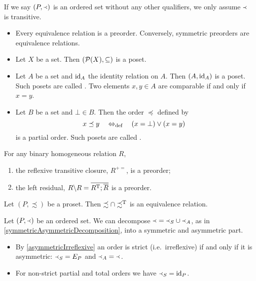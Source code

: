 If we say $\left( P,\Yleft \right)$ is an ordered set without any other qualifiers, we only assume $\Yleft$ is transitive.

\begin{example}
\begin{itemize}
\item Every equivalence relation is a preorder. Conversely, symmetric preorders are equivalence relations.
\item Let $X$ be a set. Then $\left( \operatorname{\mathcal{P}}(X), \subseteq \right)$ is a poset.
\item Let $A$ be a set and $\operatorname{id}_A$ the identity relation on $A$. Then $\left( A,\operatorname{id}_A \right)$ is a poset. Such posets are called . Two elements $x,y\in A$ are comparable if and only if $x=y$.
\item Let $B$ be a set and $\bot\in B$. Then the order $\preceq$ defined by
\[ x \preceq y \quad\Leftrightarrow_{\text{def}}\quad (x=\bot) \lor (x = y) \]
is a partial order. Such posets are called .
\end{itemize}
\end{example}

\begin{lemma}
For any binary homogeneous relation $R$,
\begin{enumerate}
\item the reflexive transitive closure, $R^{+=}$, is a preorder;
\item the left residual, $R\backslash R = \overline{R^{\mathrm{T}};\overline{R}}$ is a preorder.
\end{enumerate}
\end{lemma}

\begin{lemma} \label{preorderEquivalence}
Let $(P, \precsim)$ be a proset. Then $\precsim \cap \precsim^{\mathrm{T}}$ is an equivalence relation.
\end{lemma}

Let $\left( P,\Yleft \right)$ be an ordered set. We can decompose $\Yleft = \Yleft_S \cup \Yleft_A$, as in \ref{symmetricAsymmetricDecomposition}, into a symmetric and asymmetric part.
\begin{itemize}
\item By \ref{asymmetricIrreflexive} an order is strict (i.e.\ irreflexive) if and only if it is asymmetric: $\Yleft_S = E_P$ and $\Yleft_A = \Yleft$.
\item For non-strict partial and total orders we have $\Yleft_S = \operatorname{id}_P$.
\end{itemize}

